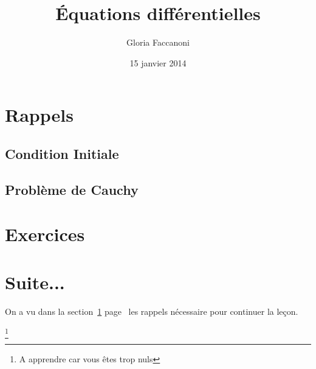 \documentclass[12pt,a4paper]{scrartcl}
\title{Équations différentielles}
\author{Gloria Faccanoni}
\date{15 janvier 2014}
\begin{document}
\maketitle

\begin{abstract}
\lipsum[1][1-5]
\end{abstract}

\tableofcontents

\lipsum[1-2]

\section{Rappels}
\label{eti}
\lipsum[3]

\subsection{Condition Initiale}
\lipsum[3]

\subsection{Problème de Cauchy}
\lipsum[4]

\section{Exercices}
\lipsum[7]

\section{Suite...}
On a vu dans la section~\ref{eti} page~\pageref{eti} les rappels nécessaire pour continuer la leçon.

\footnote
{A apprendre car vous êtes trop nuls}
\end{document}
